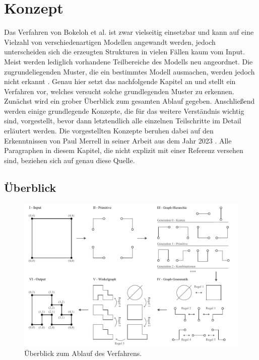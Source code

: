 %

\chapter{Konzept}
Das Verfahren von Bokeloh et al. \cite{3_bokeloh_et_al} ist zwar vielseitig einsetzbar und kann auf eine Vielzahl von verschiedenartigen
Modellen angewandt werden, jedoch unterscheiden sich die erzeugten Strukturen in vielen Fällen kaum vom Input. Meist werden lediglich
vorhandene Teilbereiche des Modells neu angeordnet. Die zugrundeliegenden Muster, die ein bestimmtes Modell ausmachen, werden jedoch
nicht erkannt \cite{1_merrell}. Genau hier setzt das nachfolgende Kapitel an und stellt ein Verfahren vor, welches versucht solche grundlegenden Muster
zu erkennen. Zunächst wird ein grober Überblick zum gesamten Ablauf gegeben. Anschließend werden einige grundlegende Konzepte, die für
das weitere Verständnis wichtig sind, vorgestellt, bevor dann letztendlich alle einzelnen Teilschritte im Detail erläutert werden.
Die vorgestellten Konzepte beruhen dabei auf den Erkenntnissen von Paul Merrell in seiner Arbeit aus dem Jahr 2023 \cite{1_merrell}.
Alle Paragraphen in diesem Kapitel, die nicht explizit mit einer Referenz versehen sind, beziehen sich auf genau diese Quelle.

\section{Überblick}

\begin{figure}[t]
    \centering
    \includegraphics[width=\imgWidth]{images/overview.pdf}
    \caption{Überblick zum Ablauf des Verfahrens.}
    \label{fig:overview}
\end{figure}

